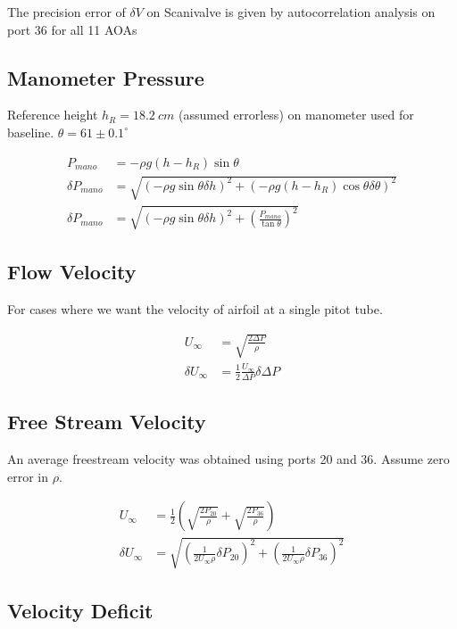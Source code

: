 \documentclass[runningheads]{llncs}
\begin{document}
The precision error of $\delta V$ on Scanivalve is given by autocorrelation analysis on port 36 for all 11 AOAs 

\subsection{Manometer Pressure}

Reference height $h_R = 18.2 \ \si{cm}$ (assumed errorless) on manometer used for baseline. $\theta = 61 \pm 0.1^\circ$

\begin{align*}
    P_{mano} &= -\rho g (h - h_R) \sin\theta\\
    \delta P_{mano} &= \sqrt{\left(-\rho g \sin \theta \delta h\right)^2 + \left(-\rho g  (h-h_R)\cos\theta \delta \theta\right)^2}\\
    \delta P_{mano} &= \sqrt{\left(-\rho g \sin \theta \delta h\right)^2 + \left(\frac{P_{mano}}{\tan \theta}\right)^2}
\end{align*}

\subsection{Flow Velocity}

For cases where we want the velocity of airfoil at a single pitot tube.

\begin{align*}
    U_\infty &=  \sqrt{\frac{2 \Delta P}{\rho}} \\
    \delta U_\infty &= \frac{1}{2}\frac{U_\infty}{\Delta P} \delta \Delta P
\end{align*}

\subsection{Free Stream Velocity}

An average freestream velocity was obtained using ports 20 and 36. Assume zero error in $\rho$.

\begin{align*}
    U_\infty &= \frac{1}{2} \left(\sqrt{\frac{2 P_{20}}{\rho}} + \sqrt{\frac{2 P_{36}}{\rho}} \right) \\
    \delta U_\infty &= \sqrt{\left(\frac{1}{2U_\infty \rho} \delta P_{20}\right)^2 + \left(\frac{1}{2U_\infty \rho } \delta P_{36}\right)^2}
\end{align*}

\subsection{Velocity Deficit}
\end{document}
